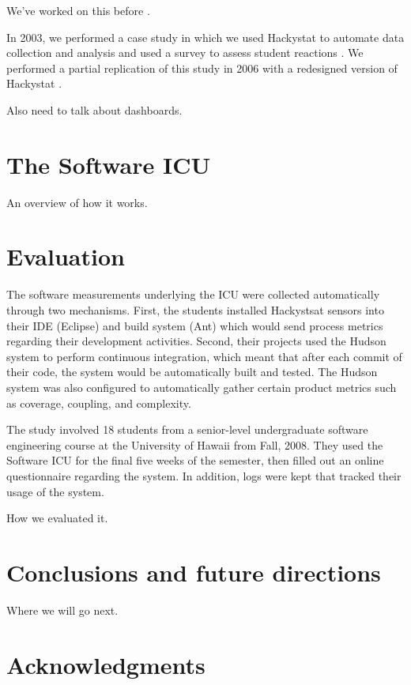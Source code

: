 \documentclass{acm_proc_article-sp}
\begin{document}
We've worked on this before \cite{csdl2-07-02,csdl2-03-12,csdl2-03-13}.

In 2003, we performed a case study in which 
we used Hackystat to automate data collection and analysis and used 
a survey to assess student reactions \cite{csdl2-03-12}.  We performed a 
partial replication of this study in 2006 with a redesigned version of
Hackystat \cite{csdl2-07-02}. 

Also need to talk about dashboards. 

\section{The Software ICU}
\label{sec:icu}

An overview of how it works.  

\section{Evaluation}
\label{sec:evaluation}

The software measurements underlying the ICU were collected automatically
through two mechanisms. First, the students installed Hackystsat sensors
into their IDE (Eclipse) and build system (Ant) which would send process
metrics regarding their development activities.  Second, their projects
used the Hudson system to perform continuous integration, which meant that
after each commit of their code, the system would be automatically built
and tested.  The Hudson system was also configured to automatically gather
certain product metrics such as coverage, coupling, and complexity.

The study involved 18 students from a senior-level undergraduate software
engineering course at the University of Hawaii from Fall, 2008.  They used
the Software ICU for the final five weeks of the semester, then filled out
an online questionnaire regarding the system.  In addition, logs were kept
that tracked their usage of the system.


How we evaluated it.

\section{Conclusions and future directions}
\label{sec:conclusions}

Where we will go next.

\section{Acknowledgments}
\end{document}
